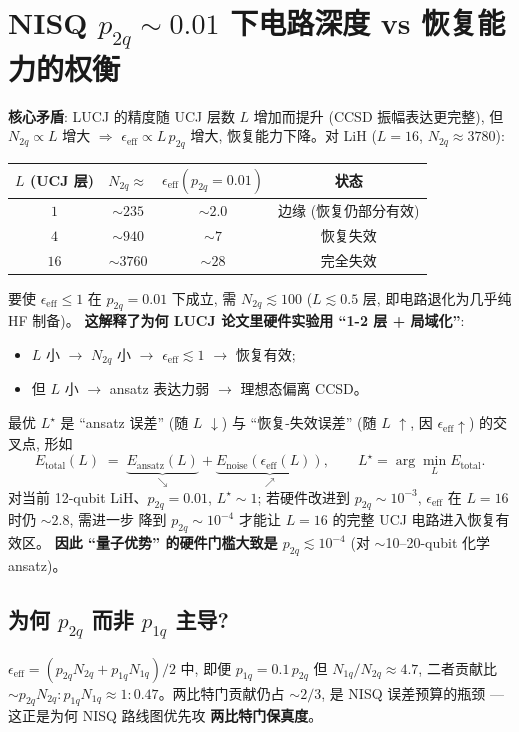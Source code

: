 \documentclass[11pt]{article}
\begin{document}
\section{NISQ $p_{2q}{\sim}0.01$ 下电路深度 vs 恢复能力的权衡}
\textbf{核心矛盾}: LUCJ 的精度随 UCJ 层数 $L$ 增加而提升 (CCSD 振幅表达更完整),
但 $N_{2q}\propto L$ 增大 $\Rightarrow$ $\epsilon_{\text{eff}}\propto L\,p_{2q}$ 增大,
恢复能力下降。对 LiH ($L{=}16$, $N_{2q}\approx3780$):
\begin{center}
\begin{tabular}{c|ccc}
$L$ (UCJ 层) & $N_{2q}\approx$ & $\epsilon_{\text{eff}}(p_{2q}{=}0.01)$ &
状态 \\
\hline
$1$  & $\sim 235$ & $\sim 2.0$ & 边缘 (恢复仍部分有效) \\
$4$  & $\sim 940$ & $\sim 7$ & 恢复失效 \\
$16$ & $\sim 3760$ & $\sim 28$ & 完全失效
\end{tabular}
\end{center}
要使 $\epsilon_{\text{eff}}\le1$ 在 $p_{2q}{=}0.01$ 下成立, 需 $N_{2q}\lesssim100$
($L\lesssim0.5$ 层, 即电路退化为几乎纯 HF 制备)。
\textbf{这解释了为何 LUCJ 论文里硬件实验用 ``1-2 层 + 局域化''}:
\begin{itemize}
  \item $L$ 小 $\to$ $N_{2q}$ 小 $\to$ $\epsilon_{\text{eff}}\lesssim1$ $\to$ 恢复有效;
  \item 但 $L$ 小 $\to$ ansatz 表达力弱 $\to$ 理想态偏离 CCSD。
\end{itemize}
最优 $L^\star$ 是 ``ansatz 误差'' (随 $L$ $\downarrow$) 与 ``恢复-失效误差''
(随 $L$ $\uparrow$, 因 $\epsilon_{\text{eff}}\uparrow$) 的交叉点, 形如
\[
  E_{\text{total}}(L)\;=\;\underbrace{E_{\text{ansatz}}(L)}_{\searrow}
                       +\underbrace{E_{\text{noise}}(\epsilon_{\text{eff}}(L))}_{\nearrow},
  \qquad L^\star=\arg\min_L E_{\text{total}}.
\]
对当前 12-qubit LiH、$p_{2q}{=}0.01$, $L^\star\sim1$; 若硬件改进到
$p_{2q}{\sim}10^{-3}$, $\epsilon_{\text{eff}}$ 在 $L{=}16$ 时仍 $\sim2.8$, 需进一步
降到 $p_{2q}{\sim}10^{-4}$ 才能让 $L{=}16$ 的完整 UCJ 电路进入恢复有效区。
\textbf{因此 ``量子优势'' 的硬件门槛大致是 $p_{2q}\lesssim10^{-4}$} (对
$\sim$10--20-qubit 化学 ansatz)。

\subsection*{为何 $p_{2q}$ 而非 $p_{1q}$ 主导?}
$\epsilon_{\text{eff}}=(p_{2q}N_{2q}+p_{1q}N_{1q})/2$ 中, 即便
$p_{1q}{=}0.1\,p_{2q}$ 但 $N_{1q}/N_{2q}\approx 4.7$, 二者贡献比
$\sim p_{2q}N_{2q}:p_{1q}N_{1q}\approx1:0.47$。两比特门贡献仍占 $\sim2/3$,
是 NISQ 误差预算的瓶颈 --- 这正是为何 NISQ 路线图优先攻 \textbf{两比特门保真度}。
\end{document}
